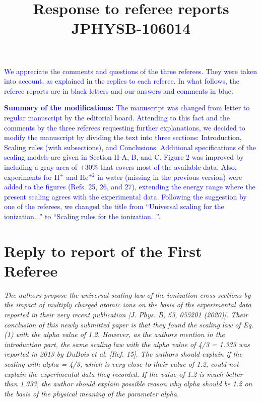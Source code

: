 \documentclass[a4paper,12pt]{article}
\title{Response to referee reports \\ JPHYSB-106014}
\def\reviewer#1{\vspace{0.35cm}\textsl{#1}}
\def\reply#1{\vspace{0.1cm}\textcolor{blue}{#1}}
\begin{document}
\maketitle

\reply{We appreciate the comments and questions of the three referees. 
They were taken into account, as explained in the replies to each 
referee. In what follows, the referee reports are in black letters and 
our answers and comments in blue. }

\reply{\textbf{Summary of the modifications:} The manuscript was 
changed from letter to regular manuscript by the editorial board. 
Attending to this fact and the comments by the three referees 
requesting further explanations, we decided to modify the manuscript by
dividing the text into three sections: Introduction, Scaling rules (with
subsections), and Conclusions. Additional specifications of the scaling 
models are given in Section II-A, B, and C. Figure 2 was improved by 
including a gray area of $\pm 30\%$ that covers most of the available 
data. Also, experiments for H$^+$ and He$^{+2}$ in water (missing in 
the previous version) were added to the figures (Refs. 25, 26, and 27), 
extending the energy range where the present scaling agrees with the 
experimental data. 
Following the suggestion by one of the referees, we changed the title 
from ``Universal scaling for the ionization...'' to ``Scaling 
rules for the ionization...''}.

\section{Reply to report of the First Referee}

\reviewer{The authors propose the universal scaling law of the 
ionization cross sections by the impact of multiply charged atomic ions 
on the basis of the experimental data reported in their very recent 
publication [J. Phys. B, 53, 055201 (2020)]. Their conclusion of this 
newly submitted paper is that they found the scaling law of Eq. (1) 
with the alpha value of 1.2. However, as the authors mention in the 
introduction part, the same scaling law with the alpha value of 
4/3 = 1.333 was reported in 2013 by DuBois et al. [Ref. 15]. The 
authors should explain if the scaling with alpha = 4/3, which is very 
close to their value of 1.2, could not explain the experimental data 
they recorded. If the value of 1.2 is much better than 1.333, the 
author should explain possible reason why alpha should be 1.2 on the 
basis of the physical meaning of the parameter alpha.}
\end{document}
